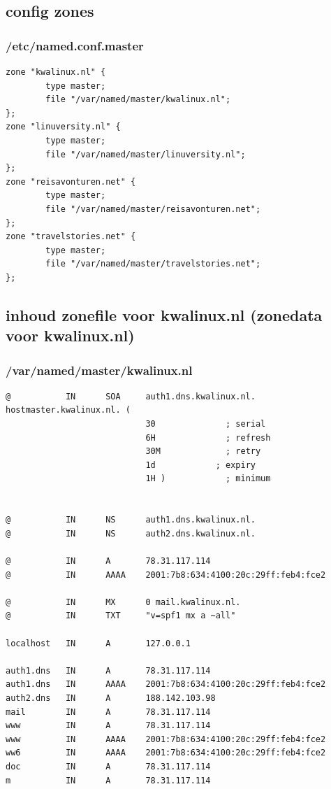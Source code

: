 \subsection{config zones}
\begin{styleframefrag}
        \frametitle{/etc/named.conf.master}
{\small
\begin{verbatim}
zone "kwalinux.nl" {
        type master;
        file "/var/named/master/kwalinux.nl";
};
zone "linuversity.nl" {
        type master;
        file "/var/named/master/linuversity.nl";
};
zone "reisavonturen.net" {
        type master;
        file "/var/named/master/reisavonturen.net";
};
zone "travelstories.net" {
        type master;
        file "/var/named/master/travelstories.net";
};
\end{verbatim}
}
\end{styleframefrag}

\subsection{inhoud zonefile voor kwalinux.nl (zonedata voor kwalinux.nl)}
\begin{styleframefrag}
        \frametitle{/var/named/master/kwalinux.nl}
{\tiny
\begin{verbatim}
@           IN      SOA     auth1.dns.kwalinux.nl. hostmaster.kwalinux.nl. (
                            30              ; serial
                            6H              ; refresh
                            30M             ; retry
                            1d            ; expiry
                            1H )            ; minimum


@           IN      NS      auth1.dns.kwalinux.nl.
@           IN      NS      auth2.dns.kwalinux.nl.

@           IN      A       78.31.117.114
@           IN      AAAA    2001:7b8:634:4100:20c:29ff:feb4:fce2

@           IN      MX      0 mail.kwalinux.nl.
@           IN      TXT     "v=spf1 mx a ~all"

localhost   IN      A       127.0.0.1

auth1.dns   IN      A       78.31.117.114
auth1.dns   IN      AAAA    2001:7b8:634:4100:20c:29ff:feb4:fce2
auth2.dns   IN      A       188.142.103.98
mail        IN      A       78.31.117.114
www         IN      A       78.31.117.114
www         IN      AAAA    2001:7b8:634:4100:20c:29ff:feb4:fce2
ww6         IN      AAAA    2001:7b8:634:4100:20c:29ff:feb4:fce2
doc         IN      A       78.31.117.114
m           IN      A       78.31.117.114
\end{verbatim}
}
\end{styleframefrag}

